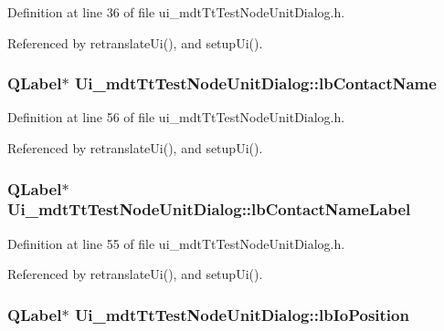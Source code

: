 Definition at line 36 of file ui\-\_\-mdt\-Tt\-Test\-Node\-Unit\-Dialog.\-h.



Referenced by retranslate\-Ui(), and setup\-Ui().

\hypertarget{class_ui__mdt_tt_test_node_unit_dialog_a653f666fdae7f899f0435416d3a342f1}{
\subsubsection[{lb\-Contact\-Name}]{\setlength{\rightskip}{0pt plus 5cm}Q\-Label$\ast$ Ui\-\_\-mdt\-Tt\-Test\-Node\-Unit\-Dialog\-::lb\-Contact\-Name}}\label{class_ui__mdt_tt_test_node_unit_dialog_a653f666fdae7f899f0435416d3a342f1}


Definition at line 56 of file ui\-\_\-mdt\-Tt\-Test\-Node\-Unit\-Dialog.\-h.



Referenced by retranslate\-Ui(), and setup\-Ui().

\hypertarget{class_ui__mdt_tt_test_node_unit_dialog_a584b745c81d5bcfe7fa7de1997479762}{
\subsubsection[{lb\-Contact\-Name\-Label}]{\setlength{\rightskip}{0pt plus 5cm}Q\-Label$\ast$ Ui\-\_\-mdt\-Tt\-Test\-Node\-Unit\-Dialog\-::lb\-Contact\-Name\-Label}}\label{class_ui__mdt_tt_test_node_unit_dialog_a584b745c81d5bcfe7fa7de1997479762}


Definition at line 55 of file ui\-\_\-mdt\-Tt\-Test\-Node\-Unit\-Dialog.\-h.



Referenced by retranslate\-Ui(), and setup\-Ui().

\hypertarget{class_ui__mdt_tt_test_node_unit_dialog_a76c2d38adeb2804d37b4727bde8816ef}{
\subsubsection[{lb\-Io\-Position}]{\setlength{\rightskip}{0pt plus 5cm}Q\-Label$\ast$ Ui\-\_\-mdt\-Tt\-Test\-Node\-Unit\-Dialog\-::lb\-Io\-Position}}\label{class_ui__mdt_tt_test_node_unit_dialog_a76c2d38adeb2804d37b4727bde8816ef}


